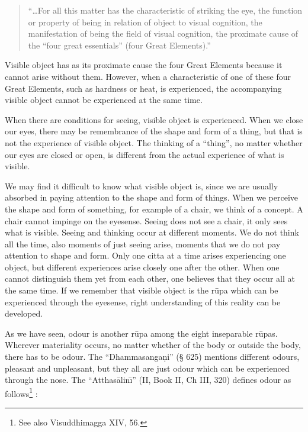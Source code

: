 \documentclass{book}
\begin{document}
\begin{quote}\begin{flushleft}
``\ldots For all this matter has the characteristic of striking the eye,
the function or property of being in relation of object to visual
cognition, the manifestation of being the field of visual cognition,
the proximate cause of the ``four great essentials'' (four Great
Elements).''
\end{flushleft} \end{quote}




Visible object has as its proximate cause the four Great Elements
because it cannot arise without them. However, when a characteristic of
one of these four Great Elements, such as hardness or heat, is
experienced, the accompanying visible object cannot be experienced at
the same time.

When there are conditions for seeing, visible object is experienced.
When we close our eyes, there may be remembrance of the shape and form
of a thing, but that is not the experience of visible object. The
thinking of a ``thing'', no matter whether our eyes are closed or open,
is different from the actual experience of what is visible. 

We may find it difficult to know what visible object is, since we are
usually absorbed in paying attention to the shape and form of things.
When we perceive the shape and form of something, for example of a
chair, we think of a concept. A chair cannot impinge on the eyesense.
Seeing does not see a chair, it only sees what is visible. Seeing and
thinking occur at different moments. We do not think all the time, also
moments of just seeing arise, moments that we do not pay attention to
shape and form. Only one citta at a time arises experiencing one
object, but different experiences arise closely one after the other.
When one cannot distinguish them yet from each other, one believes that
they occur all at the same time. If we remember that visible object is
the r\=upa which can be experienced through the eyesense, right
understanding of this reality can be developed. 

As we have seen, odour is another r\=upa among the eight inseparable
r\=upas. Wherever materiality occurs, no matter whe\-ther of the body or
outside the body, there has to be odour. The ``Dhamma\-sanga\d ni'' ({\S}
625) mentions different odours, pleasant and unpleasant, but they all
are just odour which can be experienced through the nose. The
``Atthas{\=a}lin\=\i'' (II, Book II, Ch III, 320) defines odour as
follows\footnote{See also Visuddhimagga XIV, 56.} : 
\end{document}
